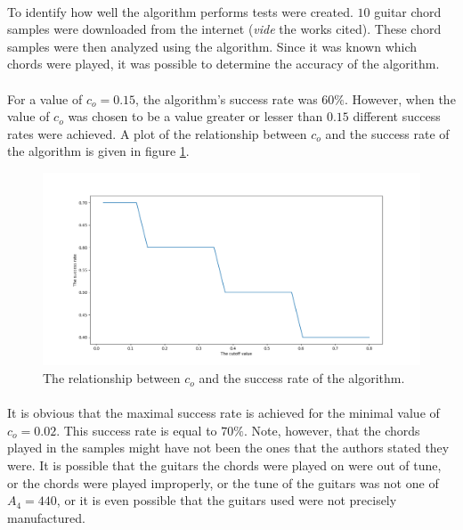 \documentclass{article}
\begin{document}
\paragraph*{}
To identify how well the algorithm performs tests were created. $10$ guitar 
chord samples were downloaded from the internet (\textit{vide} the works 
cited). These chord samples were then analyzed using the algorithm. Since it 
was known which chords were played, it was possible to determine the accuracy 
of the algorithm.

\paragraph*{}
For a value of $c_o = 0.15$, the algorithm's success rate was $60\%$. However, 
when the value of $c_o$ was chosen to be a value greater or lesser than $0.15$ 
different success rates were achieved. A plot of the relationship between 
$c_o$ and the success rate of the algorithm is given in figure 
\ref{fig:success-rate}.
\begin{figure}[ht]
	\centering
	\includegraphics{img/success-rate}
	\caption{The relationship between $c_o$ and the success rate of the 
	algorithm.}
	\label{fig:success-rate}
\end{figure}

\paragraph*{}
It is obvious that the maximal success rate is achieved for the minimal value 
of $c_o = 0.02$. This success rate is equal to $70\%$. Note, however, that 
the chords played in the samples might have not been the ones that the authors 
stated they were. It is possible that the guitars the chords were played on 
were out of tune, or the chords were played improperly, or the tune of the 
guitars was not one of $A_4 = 440$, or it is even possible that the guitars 
used were not precisely manufactured.
\end{document}
